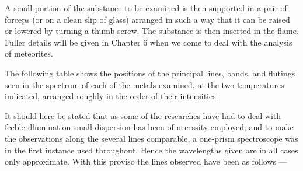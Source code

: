 \documentclass[a4paper, 12pt, oneside, polutonikogreek, english]{article}
\begin{document}
A small portion of the substance to be examined is then supported in a pair of forceps (or on a clean slip of glass) arranged in such a way that it can be raised or lowered by turning a thumb-screw. The substance is then inserted in the flame. Fuller details will be given in Chapter 6 when we come to deal with the analysis of meteorites.

The following table shows the positions of the principal lines, bands, and flutings seen in the spectrum of each of the metals examined, at the two temperatures indicated, arranged roughly in the order of their intensities.

It should here be stated that as some of the researches have had to deal with feeble illumination small dispersion has been of necessity employed; and to make the observations along the several lines comparable, a one-prism spectroscope was in the first instance used throughout. Hence the wavelengths given are in all cases only approximate. With this proviso the lines observed have been as follows ---
\end{document}
